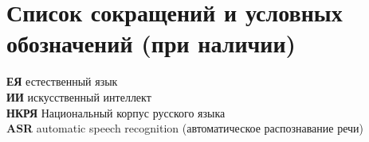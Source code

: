 \chapter*{Список сокращений и условных обозначений (при наличии)} %
\noindent
\textbf{ЕЯ} естественный язык \\
\textbf{ИИ} искусственный интеллект \\
\textbf{НКРЯ} Национальный корпус русского языка \\
\textbf{ASR} automatic speech recognition (автоматическое распознавание речи)
